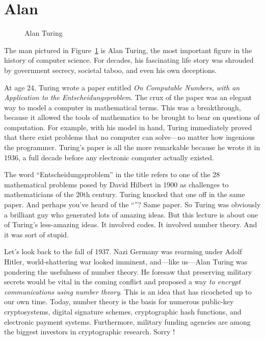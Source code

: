 \begin{problems}
\classproblems
{}
\end{problems}

\section{Alan }\label{Turing_sec}

\begin{figure}\redrawntrue
{}
\caption{Alan Turing}
\label{fig:Turing}
\end{figure}

The man pictured in Figure~\ref{fig:Turing} is Alan Turing, the most
important figure in the history of computer science.  For decades, his
fascinating life story was shrouded by government secrecy, societal
taboo, and even his own deceptions.

At age 24, Turing wrote a paper entitled \emph{On Computable Numbers,
with an Application to the Entscheidungsproblem}.  The crux of the
paper was an elegant way to model a computer in mathematical terms.
This was a breakthrough, because it allowed the tools of mathematics
to be brought to bear on questions of computation.  For example, with
his model in hand, Turing immediately proved that there exist problems
that no computer can solve---no matter how ingenious the programmer.
Turing's paper is all the more remarkable because he wrote it in 1936,
a full decade before any electronic computer actually existed.

The word ``Entscheidungsproblem'' in the title refers to one of the 28
mathematical problems posed by David Hilbert in 1900 as challenges to
mathematicians of the 20th century.  Turing knocked that one off in the
same paper.  And perhaps you've heard of the ``''?  Same paper.  So Turing was obviously a brilliant guy who
generated lots of amazing ideas.  But this lecture is about one of
Turing's less-amazing ideas.  It involved codes.  It involved number
theory.  And it was sort of stupid.


Let's look back to the fall of 1937.  Nazi Germany was rearming under
Adolf Hitler, world-shattering war looked imminent, and---like
us---Alan Turing was pondering the usefulness of number theory.  He
foresaw that preserving military secrets would be vital in the coming
conflict and proposed a way \emph{to encrypt communications using
number theory}.  This is an idea that has ricocheted up to our own
time.  Today, number theory is the basis for numerous public-key
cryptosystems, digital signature schemes, cryptographic hash
functions, and electronic payment systems.  Furthermore, military
funding agencies are among the biggest investors in cryptographic
research.  Sorry !

